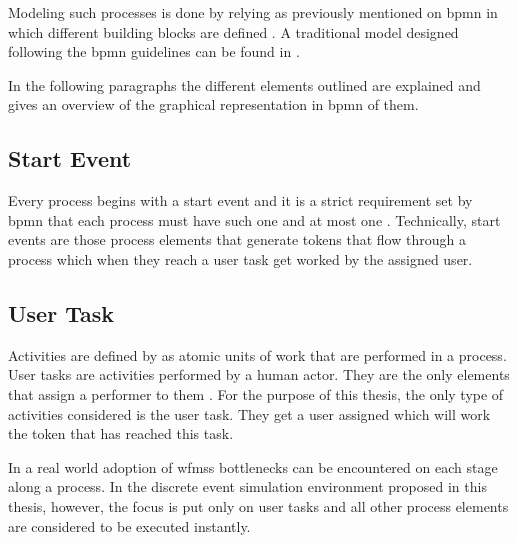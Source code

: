 Modeling such processes is done by relying as previously mentioned on \gls{bpmn} in which different building blocks are defined \citep{Silver2011}. A traditional model designed following the \gls{bpmn} guidelines can be found in .


In the following paragraphs the different elements outlined are explained and  gives an overview of the graphical representation in \gls{bpmn} of them.


\subsection{Start Event}

Every process begins with a start event and it is a strict requirement set by \gls{bpmn} that each process must have such one and at most one \citep{Silver2011}. Technically, start events are those process elements that generate tokens that flow through a process which when they reach a user task get worked by the assigned user.

\subsection{User Task}

Activities are defined by \citet{Silver2011} as atomic units of work that are performed in a process. User tasks are activities performed by a human actor. They are the only elements that assign a performer to them \citep{Silver2011}. For the purpose of this thesis, the only type of activities considered is the user task. They get a user assigned which will work the token that has reached this task. 

In a real world adoption of \glspl{wfms} bottlenecks can be encountered on each stage along a process. In the discrete event simulation environment proposed in this thesis, however, the focus is put only on user tasks and all other process elements are considered to be executed instantly.

